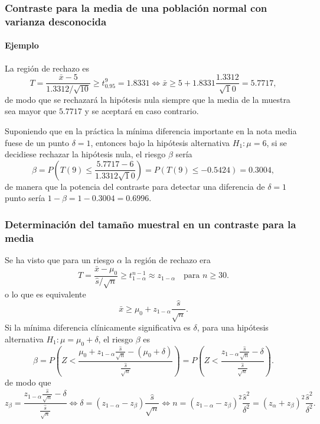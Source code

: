 \begin{frame}
\frametitle{Contraste para la media de una población normal con varianza desconocida}
\framesubtitle{Ejemplo}
La región de rechazo es
\[
T=\frac{\bar x-5}{1.3312/\sqrt{10}} \geq t^9_{0.95} = 1.8331 \Leftrightarrow \bar x \geq 5+1.8331\frac{1.3312}{\sqrt
10} = 5.7717,
\]
de modo que se rechazará la hipótesis nula siempre que la media de la muestra sea mayor que $5.7717$ y se aceptará en caso contrario.

Suponiendo que en la práctica la mínima diferencia importante en la nota media fuese de un punto $\delta=1$, entonces bajo la hipótesis alternativa $H_1:\mu=6$, si se decidiese rechazar la hipótesis nula, el riesgo $\beta$ sería
\[
\beta = P\left(T(9)\leq \frac{5.7717-6}{1.3312\sqrt 10}\right) = P(T(9)\leq -0.5424) = 0.3004,
\]
de manera que la potencia del contraste para detectar una diferencia de $\delta=1$ punto sería $1-\beta=1-0.3004 = 0.6996$.
\end{frame}


\begin{frame}
\frametitle{Determinación del tamaño muestral en un contraste para la media}
Se ha visto que para un riesgo $\alpha$ la región de rechazo era
\[
T=\frac{\bar x-\mu_0}{\hat s/\sqrt{n}} \geq t^{n-1}_{1-\alpha} \approx z_{1-\alpha}\quad \text{para } n\geq 30.
\]
o lo que es equivalente
\[
\bar x \geq \mu_0+z_{1-\alpha}\frac{\hat s}{\sqrt n}.
\]
Si la mínima diferencia clínicamente significativa es $\delta$, para una hipótesis alternativa $H_1:\mu=\mu_0+\delta$, el riesgo $\beta$ es
\[
\beta = P\left(Z< \frac{\mu_0+z_{1-\alpha}\frac{\hat s}{\sqrt n}-(\mu_0+\delta)}{\frac{\hat s}{\sqrt n}} \right) = P\left(Z< \frac{z_{1-\alpha}\frac{\hat s}{\sqrt n}-\delta}{\frac{\hat s}{\sqrt n}} \right).
\]
de modo que
\[
z_\beta = \frac{z_{1-\alpha}\frac{\hat s}{\sqrt n}-\delta}{\frac{\hat s}{\sqrt n}} \Leftrightarrow \delta = (z_{1-\alpha}-z_\beta)\frac{\hat s}{\sqrt n} \Leftrightarrow n = (z_{1-\alpha}-z_\beta)^2\frac{\hat s^2}{\delta^2} = (z_\alpha+z_\beta)^2\frac{\hat s^2}{\delta^2}.
\]
\end{frame}


